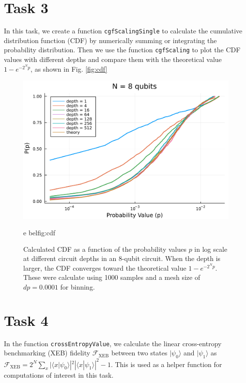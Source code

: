 \documentclass[12pt]{article}
\begin{document}
\section*{Task 3}

In this task, we create a function \texttt{cgfScalingSingle} to calculate the cumulative distribution function (CDF) by numerically summing or integrating the probability distribution. Then we use the function \texttt{cgfScaling} to plot the CDF values with different depths and compare them with the theoretical value $1-e^{-2^Np}$, as shown in Fig. \ref{fig:cdf}

\begin{figure}
	\centering
	\includegraphics [width=0.8\linewidth] {figures/Task3}
	\caption{
		Calculated CDF as a function of the probability values $p$ in log scale at different circuit depths in an 8-qubit circuit. When the depth is larger, the CDF converges toward the theoretical value $1- e^{-2^Np}$. These were calculate using 1000 samples and a mesh size of $dp = 0.0001$ for binning.
	}e
	\label{•}bel{fig:cdf}
\end{figure}

\section*{Task 4}

In the function \texttt{crossEntropyValue}, we calculate the linear cross-entropy benchmarking (XEB) fidelity $\mathcal{F}_\mathrm{XEB}$ between two states $|\psi_0\rangle$ and $|\psi_1\rangle$ as $\mathcal{F}_\mathrm{XEB} = 2^N \sum_{x} |\langle x|\psi_0\rangle|^2 |\langle x|\psi_1\rangle|^2 - 1$. This is used as a helper function for computations of interest in this task. 
\end{document}
